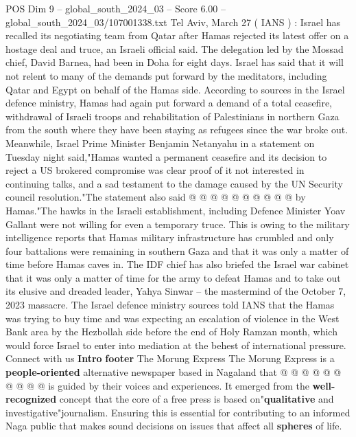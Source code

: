 \begin{textsample}{POS Dim 9 – global\_south\_2024\_03 – Score 6.00 – global\_south\_2024\_03/107001338.txt}  \label{ex:f9_pos_045}
Tel Aviv, March 27 ( IANS ) : Israel has recalled its negotiating team from Qatar after Hamas rejected its latest offer on a hostage deal and truce, an Israeli official said.
The delegation led by the Mossad chief, David Barnea, had been in Doha for eight days.
Israel has said that it will not relent to many of the demands put forward by the meditators, including Qatar and Egypt on behalf of the Hamas side.
According to sources in the Israel defence ministry, Hamas had again put forward a demand of a total ceasefire, withdrawal of Israeli troops and rehabilitation of Palestinians in northern Gaza from the south where they have been staying as refugees since the war broke out.
Meanwhile, Israel Prime Minister Benjamin Netanyahu in a statement on Tuesday night said,"Hamas wanted a permanent ceasefire and its decision to reject a US brokered compromise was clear proof of it not interested in continuing talks, and a sad testament to the damage caused by the UN Security council resolution."The statement also said @ @ @ @ @ @ @ @ @ @ by Hamas."The hawks in the Israeli establishment, including Defence Minister Yoav Gallant were not willing for even a temporary truce.
This is owing to the military intelligence reports that Hamas military infrastructure has crumbled and only four battalions were remaining in southern Gaza and that it was only a matter of time before Hamas caves in.
The IDF chief has also briefed the Israel war cabinet that it was only a matter of time for the army to defeat Hamas and to take out its elusive and dreaded leader, Yahya Sinwar -- the mastermind of the October 7, 2023 massacre.
The Israel defence ministry sources told IANS that the Hamas was trying to buy time and was expecting an escalation of violence in the West Bank area by the Hezbollah side before the end of Holy Ramzan month, which would force Israel to enter into mediation at the behest of international pressure.
Connect with us \textbf{Intro} \textbf{footer} The Morung Express The Morung Express is a \textbf{people-oriented} alternative newspaper based in Nagaland that @ @ @ @ @ @ @ @ @ @ is guided by their voices and experiences.
It emerged from the \textbf{well-recognized} concept that the core of a free press is based on"\textbf{qualitative} and investigative"journalism.
Ensuring this is essential for contributing to an informed Naga public that makes sound decisions on issues that affect all \textbf{spheres} of life.

\end{textsample}

